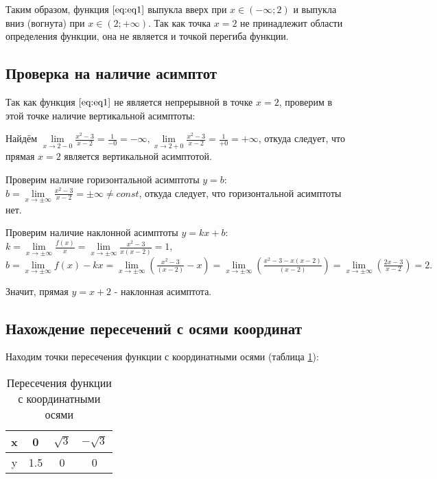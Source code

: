 Таким образом, функция $\eqref{eq:eq1}$ выпукла вверх при $x \in (-\infty; 2)$ и выпукла вниз (вогнута) при $x \in (2; +\infty)$. Так как точка $x = 2$ не принадлежит области определения функции, она не является и точкой перегиба функции.

\subsection{Проверка на наличие асимптот}

Так как функция $\eqref{eq:eq1}$ не является непрерывной в точке $x = 2$, проверим в этой точке наличие вертикальной асимптоты:

Найдём $\lim\limits_{x\to 2-0} \frac{x^2-3}{x-2} = \frac{1}{-0} = -\infty, \lim\limits_{x\to 2+0} \frac{x^2-3}{x-2} = \frac{1}{+0} = +\infty$, откуда следует, что прямая $x = 2$ является вертикальной асимптотой.

Проверим наличие горизонтальной асимптоты $y = b$: $b = \lim\limits_{x\to \pm \infty} \frac{x^2-3}{x-2} =  \pm \infty \neq const$, откуда следует, что горизонтальной асимптоты нет.

Проверим наличие наклонной асимптоты $y = kx + b$: $k = \lim\limits_{x\to \pm \infty} \frac{f(x)}{x} = \lim\limits_{x\to \pm \infty} \frac{x^2-3}{x(x-2)} = 1,$ $b = \lim\limits_{x\to \pm \infty} f(x) - kx = \lim\limits_{x\to \pm \infty} \left(\frac{x^2-3}{(x-2)}-x\right) = \lim\limits_{x\to \pm \infty} \left(\frac{x^2-3-x(x-2)}{(x-2)}\right) = \lim\limits_{x\to \pm \infty}\left(\frac{2x-3}{x-2}\right) = 2.$

Значит, прямая $y = x + 2$ - наклонная асимптота.

\subsection{Нахождение пересечений с осями координат}

Находим точки пересечения функции с координатными осями (таблица \ref{tabular:tab1}): 

\begin{table}[H]
	\caption{Пересечения функции с координатными осями}
	\begin{center}
		\begin{tabular}{|c|c|c|c|}
			\hline
			x & 0 & $\sqrt{3}$ & $-\sqrt{3}$ \\ \hline
			y & 1.5 & 0 & 0 \\ \hline
		\end{tabular}
		\label{tabular:tab1}
	\end{center}
\end{table}

